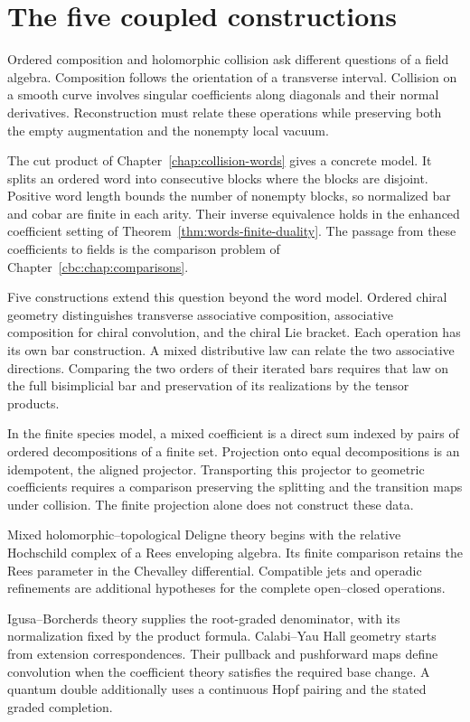 \chapter*{The five coupled constructions}

Ordered composition and holomorphic collision ask different questions of a
field algebra. Composition follows the orientation of a transverse interval.
Collision on a smooth curve involves singular coefficients along diagonals
and their normal derivatives. Reconstruction must relate these operations
while preserving both the empty augmentation and the nonempty local vacuum.

The cut product of Chapter~\ref{chap:collision-words} gives a concrete model.
It splits an ordered word into consecutive blocks where the blocks are
disjoint. Positive word length bounds the number of nonempty blocks, so
normalized bar and cobar are finite in each arity. Their inverse equivalence
holds in the enhanced coefficient setting of
Theorem~\ref{thm:words-finite-duality}. The passage from these coefficients to
fields is the comparison problem of Chapter~\ref{cbc:chap:comparisons}.

Five constructions extend this question beyond the word model.
Ordered chiral geometry distinguishes transverse associative composition,
associative composition for chiral convolution, and the chiral Lie bracket.
Each operation has its own bar construction. A mixed distributive law can
relate the two associative directions. Comparing the two orders of their
iterated bars requires that law on the full bisimplicial bar and preservation
of its realizations by the tensor products.

In the finite species model, a mixed coefficient is a direct sum indexed by
pairs of ordered decompositions of a finite set. Projection onto equal
decompositions is an idempotent, the aligned projector. Transporting this
projector to geometric coefficients requires a comparison preserving the
splitting and the transition maps under collision. The finite projection
alone does not construct these data.

Mixed holomorphic--topological Deligne theory begins with the relative
Hochschild complex of a Rees enveloping algebra. Its finite comparison
retains the Rees parameter in the Chevalley differential. Compatible jets
and operadic refinements are additional hypotheses for the complete
open--closed operations.

Igusa--Borcherds theory supplies the root-graded denominator, with its
normalization fixed by the product formula. Calabi--Yau Hall geometry starts
from extension correspondences. Their pullback and pushforward maps define
convolution when the coefficient theory satisfies the required base change.
A quantum double additionally uses a continuous Hopf pairing and the stated
graded completion.

